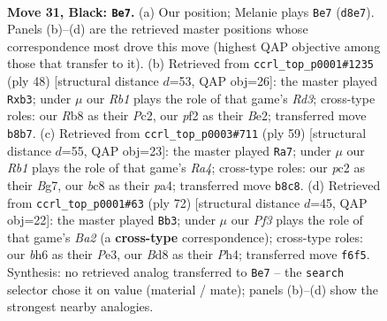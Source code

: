 \documentclass[11pt]{article}
\begin{document}
\clearpage

\begin{figure}[p]\centering
\begin{subfigure}{0.46\textwidth}\centering
\resizebox{\linewidth}{!}{%
\newchessgame
\chessboard[
  setfen={1rBb3k/p6p/2p2ppB/8/5P1P/3P1N2/PPP2PK1/4R3 b - - 0 31},
  showmover=false,
  pgfstyle=straightmove, color=movearrow, markmove={d8-e7}
]}
\caption{}
\end{subfigure}\hfill
\begin{subfigure}{0.46\textwidth}\centering
\resizebox{\linewidth}{!}{%
\newchessgame
\chessboard[
  setfen={2r5/1p2kp2/p1n3p1/4p1p1/4P3/Pb1R3P/1PP1BPP1/6K1 w - - 0 25},
  showmover=false,
  pgfstyle=straightmove, color=movearrow, markmove={d3-b3}
]}
\caption{}
\end{subfigure}
\\[4pt]
\begin{subfigure}{0.46\textwidth}\centering
\resizebox{\linewidth}{!}{%
\newchessgame
\chessboard[
  setfen={1r4k1/5pb1/6p1/rBPp4/P4pP1/5N2/5PKP/2R5 b - - 1 30},
  showmover=false,
  pgfstyle=straightmove, color=movearrow, markmove={a5-a7}
]}
\caption{}
\end{subfigure}\hfill
\begin{subfigure}{0.46\textwidth}\centering
\resizebox{\linewidth}{!}{%
\newchessgame
\chessboard[
  setfen={8/1p2k2p/1P1p1p2/1brP1p2/1R2p2P/4P3/B4PP1/4K3 w - - 9 37},
  showmover=false,
  pgfstyle=straightmove, color=movearrow, markmove={a2-b3}
]}
\caption{}
\end{subfigure}
\caption{\textbf{Move 31, Black: \texttt{Be7}.} (a) Our position; Melanie plays \texttt{Be7} (\texttt{d8e7}). Panels (b)--(d) are the retrieved master positions whose correspondence most drove this move (highest QAP objective among those that transfer to it). (b) Retrieved from \texttt{ccrl\_top\_p0001\#1235} (ply 48) [structural distance $d$=53, QAP obj=26]: the master played \texttt{Rxb3}; under $\mu$ our \emph{Rb1} plays the role of that game's \emph{Rd3}; cross-type roles: our \emph{R}b8 as their \emph{P}c2, our \emph{p}f2 as their \emph{B}e2; transferred move \texttt{b8b7}. (c) Retrieved from \texttt{ccrl\_top\_p0003\#711} (ply 59) [structural distance $d$=55, QAP obj=23]: the master played \texttt{Ra7}; under $\mu$ our \emph{Rb1} plays the role of that game's \emph{Ra4}; cross-type roles: our \emph{p}c2 as their \emph{B}g7, our \emph{b}c8 as their \emph{p}a4; transferred move \texttt{b8c8}. (d) Retrieved from \texttt{ccrl\_top\_p0001\#63} (ply 72) [structural distance $d$=45, QAP obj=22]: the master played \texttt{Bb3}; under $\mu$ our \emph{Pf3} plays the role of that game's \emph{Ba2} (a \textbf{cross-type} correspondence); cross-type roles: our \emph{b}h6 as their \emph{P}e3, our \emph{B}d8 as their \emph{P}h4; transferred move \texttt{f6f5}. Synthesis: no retrieved analog transferred to \texttt{Be7} -- the \texttt{search} selector chose it on value (material / mate); panels (b)--(d) show the strongest nearby analogies.}
\label{fig:thought-m61}
\end{figure}
\end{document}
